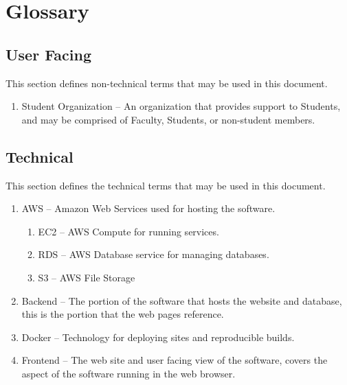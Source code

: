 \newpage %
\section{Glossary}
    \subsection{User Facing}
    This section defines non-technical terms that may be used in this document.
    \begin{enumerate}[leftmargin=3\parindent]
    	\item Student Organization -- An organization that provides support to Students, and may be comprised of Faculty, Students, or non-student members.
    \end{enumerate}

    \subsection{Technical}
    This section defines the technical terms that may be used in this document.
    \begin{enumerate}[leftmargin=3\parindent]
    	\item AWS -- Amazon Web Services used for hosting the software.
    	\begin{enumerate}[leftmargin=3\parindent]
    		\item EC2 -- AWS Compute for running services.
    		\item RDS -- AWS Database service for managing databases.
    		\item S3 -- AWS File Storage
    	\end{enumerate}
    	\item Backend -- The portion of the software that hosts the website and database, this is the portion that the web pages reference.
    	\item Docker -- Technology for deploying sites and reproducible builds.
    	\item Frontend -- The web site and user facing view of the software, covers the aspect of the software running in the web browser.
    \end{enumerate}

    \documentsGlossary




